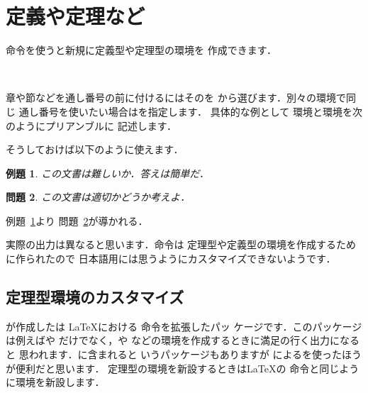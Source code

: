 \section{定義や定理など}
命令を使うと新規に定義型や定理型の環境を
作成できます．
\begin{Syntax}
\\
%
\end{Syntax}
章や節などを通し番号の前に付けるにはそのを
から選びます．別々の環境で同じ
通し番号を使いたい場合はを指定します．
具体的な例として 環境と環境を次のようにプリアンブルに
記述します．

\begin{InTeX}
\newtheorem{Prob}{問題}[chapter]
\newtheorem{Exe}[Prob]{例題} 
\end{InTeX}

そうしておけば以下のように使えます．

\begin{InOut}
\begin{Exe}\label{Hoge:ware}
この文書は難しいか．答えは簡単だ．
\end{Exe}
\begin{Prob}\label{Geho:yueni}
この文書は適切かどうか考えよ．
\end{Prob}
例題~\ref{Hoge:ware}より
問題~\ref{Geho:yueni}が導かれる． 
\end{InOut}

実際の出力は異なると思います．命令は
定理型や定義型の環境を作成するために作られたので
日本語用には思うようにカスタマイズできないようです．

\subsection{定理型環境のカスタマイズ}
%
%
%
が作成したは
{\LaTeX}における 命令を拡張したパッ
ケージです．このパッケージは例えばや
だけでなく，や
などの環境を作成するときに満足の行く出力になると
思われます．{\AmSLaTeX}に含まれると
いうパッケージもありますが
によるを使ったほうが便利だと思います．
定理型の環境を新設するときは{\LaTeX}の 
命令と同じように環境を新設します．
\begin{Syntax}
\end{Syntax}


